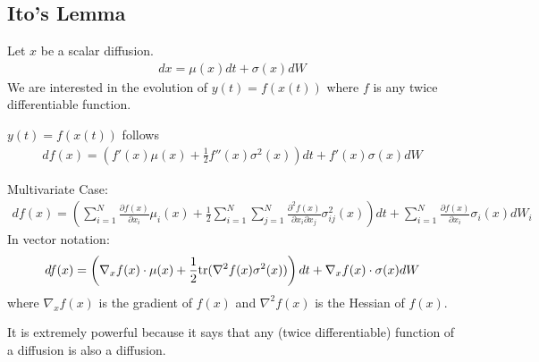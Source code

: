 \documentclass[11pt]{elegantbook}
\begin{document}
\subsection{Ito's Lemma}
Let $x$ be a scalar diffusion.
\begin{equation}
    \begin{aligned}
        dx=\mu(x)dt+\sigma(x)dW
    \end{aligned}
    \nonumber
\end{equation}
We are interested in the evolution of $y(t)=f(x(t))$ where $f$ is any twice differentiable function.
\begin{lemma}
    $y(t)=f(x(t))$ follows
    \begin{equation}
        \begin{aligned}
            d f(x)=\left(f'(x)\mu(x)+\frac{1}{2}f''(x)\sigma^2(x)\right)dt+f'(x)\sigma(x)dW
        \end{aligned}
        \nonumber
    \end{equation}
\end{lemma}
Multivariate Case:
\begin{equation}
    \begin{aligned}
        d f(x)=\left(\sum_{i=1}^N\frac{\partial f(x)}{\partial x_i}\mu_i(x)+\frac{1}{2}\sum_{i=1}^N\sum_{j=1}^N \frac{\partial^2 f(x)}{\partial x_i \partial x_j}\sigma_{ij}^2(x)\right)dt+\sum_{i=1}^N\frac{\partial f(x)}{\partial x_i}\sigma_i(x)dW_i
    \end{aligned}
    \nonumber
\end{equation}
In vector notation:
\begin{equation}
    \begin{aligned}
        d f(x) = \left(\nabla_x f(x)\cdot\mu(x)+\frac{1}{2}\textnormal{tr}(\nabla^2f(x)\sigma^2(x))\right)dt+\nabla_x f(x)\cdot\sigma(x)dW
    \end{aligned}
    \nonumber
\end{equation}
where $\nabla_x f(x)$ is the gradient of $f(x)$ and $\nabla^2f(x)$ is the Hessian of $f(x)$.
\begin{note}
    It is extremely powerful because it says that any (twice differentiable) function of a diffusion is also a diffusion.
\end{note}
\end{document}
